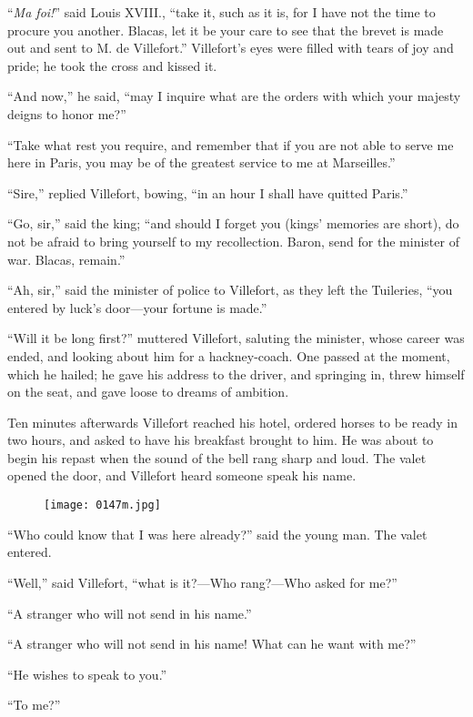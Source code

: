 “\textit{Ma foi!}” said Louis XVIII., “take it, such as it is, for I have not
the time to procure you another. Blacas, let it be your care to see
that the brevet is made out and sent to M. de Villefort.” Villefort’s
eyes were filled with tears of joy and pride; he took the cross and
kissed it.

“And now,” he said, “may I inquire what are the orders with which your
majesty deigns to honor me?”

“Take what rest you require, and remember that if you are not able to
serve me here in Paris, you may be of the greatest service to me at
Marseilles.”

“Sire,” replied Villefort, bowing, “in an hour I shall have quitted
Paris.”

“Go, sir,” said the king; “and should I forget you (kings’ memories are
short), do not be afraid to bring yourself to my recollection. Baron,
send for the minister of war. Blacas, remain.”

“Ah, sir,” said the minister of police to Villefort, as they left the
Tuileries, “you entered by luck’s door—your fortune is made.”

“Will it be long first?” muttered Villefort, saluting the minister,
whose career was ended, and looking about him for a hackney-coach. One
passed at the moment, which he hailed; he gave his address to the
driver, and springing in, threw himself on the seat, and gave loose to
dreams of ambition.

Ten minutes afterwards Villefort reached his hotel, ordered horses to
be ready in two hours, and asked to have his breakfast brought to him.
He was about to begin his repast when the sound of the bell rang sharp
and loud. The valet opened the door, and Villefort heard someone speak
his name.

\begin{figure}[ht]
\texttt{[image: 0147m.jpg]}
\end{figure}

“Who could know that I was here already?” said the young man. The valet
entered.

“Well,” said Villefort, “what is it?—Who rang?—Who asked for me?”

“A stranger who will not send in his name.”

“A stranger who will not send in his name! What can he want with me?”

“He wishes to speak to you.”

“To me?”


